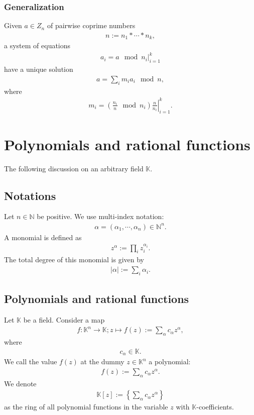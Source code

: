 \documentclass[11pt]{book}
\begin{document}
\subsubsection{Generalization}
Given $a \in Z_n$ of pairwise coprime numbers
\begin{eqnarray}
n := n_1 * \cdots * n_k,
\end{eqnarray}
a system of equations
\begin{eqnarray}
\left. a_i = a \mod n_i \right|_{i=1}^k
\end{eqnarray}
have a unique solution
\begin{eqnarray}
a = \sum_i m_i a_i \mod n,
\end{eqnarray}
where
\begin{eqnarray}
\left. m_i = \left( \frac{n_i}{n} \mod n_i \right) \frac{n}{n_i} \right|_{i=1}^k.
\end{eqnarray}

\section{Polynomials and rational functions}
The following discussion on an arbitrary field $\mathbb{K}$.

\subsection{Notations}
Let $n \in \mathbb{N}$ be positive. 
We use multi-index notation:
\begin{eqnarray}
\alpha = (\alpha_1, \cdots, \alpha_n) \in \mathbb{N}^n.
\end{eqnarray}
A monomial is defined as
\begin{eqnarray}
z^\alpha := \prod_i z_i^{\alpha_i}.
\end{eqnarray}
The total degree of this monomial is given by
\begin{eqnarray}
|\alpha| := \sum_i \alpha_i.
\end{eqnarray}

\subsection{Polynomials and rational functions}
Let $\mathbb{K}$ be a field.
Consider a map
\begin{eqnarray}
f : \mathbb{K}^n \to \mathbb{K}; z \mapsto f(z) := \sum_\alpha c_\alpha z^\alpha,
\end{eqnarray}
where
\begin{eqnarray}
c_\alpha \in \mathbb{K}.
\end{eqnarray}
We call the value $f(z)$ at the dummy $z \in \mathbb{K}^n$ a polynomial:
\begin{eqnarray}
f(z) := \sum_\alpha c_\alpha z^\alpha.
\end{eqnarray}
We denote
\begin{eqnarray}
\mathbb{K}[z] := \left\{ \sum_\alpha c_\alpha z^\alpha \right\}
\end{eqnarray}
as the ring of all polynomial functions in the variable $z$ with $\mathbb{K}$-coefficients.
\end{document}
